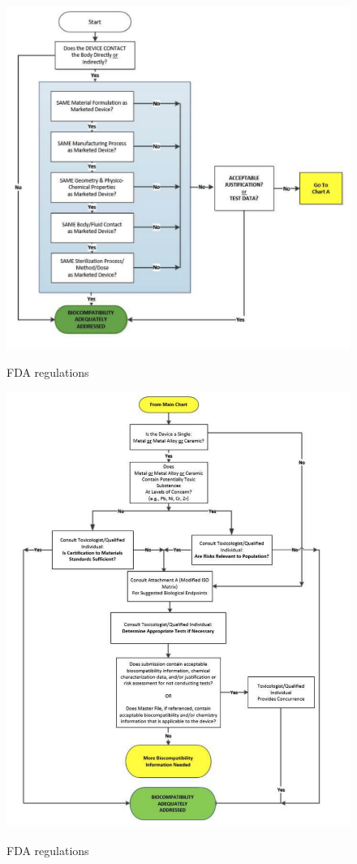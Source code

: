 \documentclass{Configuration_Files/PoliMi3i_thesis}
\begin{document}
\begin{figure}[H]
	\includegraphics[scale=0.25]{figure1_fda.png}
	\centering
    \label{fda_1}
    \caption{FDA regulations}
\end{figure}
\begin{figure}[H]

	\includegraphics[scale=0.25]{figure2_fda.png}
	\centering
    \label{fda_2}
    \caption{FDA regulations}
\end{figure}
\end{document}
